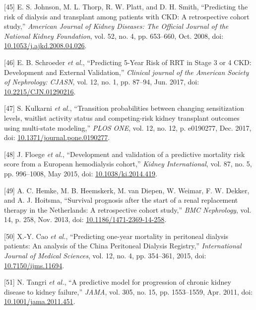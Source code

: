 \documentclass[12pt,PhD,twoside,openright]{muthesis}
\newenvironment{cslreferences}%
  {}%
  {\par}
\begin{document}
\begin{cslreferences}
\leavevmode\hypertarget{ref-johnson_predicting_2008}{}%
{[}45{]} E. S. Johnson, M. L. Thorp, R. W. Platt, and D. H. Smith, ``Predicting the risk of dialysis and transplant among patients with CKD: A retrospective cohort study,'' \emph{American Journal of Kidney Diseases: The Official Journal of the National Kidney Foundation}, vol. 52, no. 4, pp. 653--660, Oct. 2008, doi: \href{https://doi.org/10.1053/j.ajkd.2008.04.026}{10.1053/j.ajkd.2008.04.026}.

\leavevmode\hypertarget{ref-schroeder_predicting_2017}{}%
{[}46{]} E. B. Schroeder \emph{et al.}, ``Predicting 5-Year Risk of RRT in Stage 3 or 4 CKD: Development and External Validation,'' \emph{Clinical journal of the American Society of Nephrology: CJASN}, vol. 12, no. 1, pp. 87--94, Jun. 2017, doi: \href{https://doi.org/10.2215/CJN.01290216}{10.2215/CJN.01290216}.

\leavevmode\hypertarget{ref-kulkarni_transition_2017}{}%
{[}47{]} S. Kulkarni \emph{et al.}, ``Transition probabilities between changing sensitization levels, waitlist activity status and competing-risk kidney transplant outcomes using multi-state modeling,'' \emph{PLOS ONE}, vol. 12, no. 12, p. e0190277, Dec. 2017, doi: \href{https://doi.org/10.1371/journal.pone.0190277}{10.1371/journal.pone.0190277}.

\leavevmode\hypertarget{ref-floege_development_2015}{}%
{[}48{]} J. Floege \emph{et al.}, ``Development and validation of a predictive mortality risk score from a European hemodialysis cohort,'' \emph{Kidney International}, vol. 87, no. 5, pp. 996--1008, May 2015, doi: \href{https://doi.org/10.1038/ki.2014.419}{10.1038/ki.2014.419}.

\leavevmode\hypertarget{ref-hemke_survival_2013}{}%
{[}49{]} A. C. Hemke, M. B. Heemskerk, M. van Diepen, W. Weimar, F. W. Dekker, and A. J. Hoitsma, ``Survival prognosis after the start of a renal replacement therapy in the Netherlands: A retrospective cohort study,'' \emph{BMC Nephrology}, vol. 14, p. 258, Nov. 2013, doi: \href{https://doi.org/10.1186/1471-2369-14-258}{10.1186/1471-2369-14-258}.

\leavevmode\hypertarget{ref-cao_predicting_2015}{}%
{[}50{]} X.-Y. Cao \emph{et al.}, ``Predicting one-year mortality in peritoneal dialysis patients: An analysis of the China Peritoneal Dialysis Registry,'' \emph{International Journal of Medical Sciences}, vol. 12, no. 4, pp. 354--361, 2015, doi: \href{https://doi.org/10.7150/ijms.11694}{10.7150/ijms.11694}.

\leavevmode\hypertarget{ref-tangri_predictive_2011}{}%
{[}51{]} N. Tangri \emph{et al.}, ``A predictive model for progression of chronic kidney disease to kidney failure,'' \emph{JAMA}, vol. 305, no. 15, pp. 1553--1559, Apr. 2011, doi: \href{https://doi.org/10.1001/jama.2011.451}{10.1001/jama.2011.451}.


\end{cslreferences}
\end{document}
